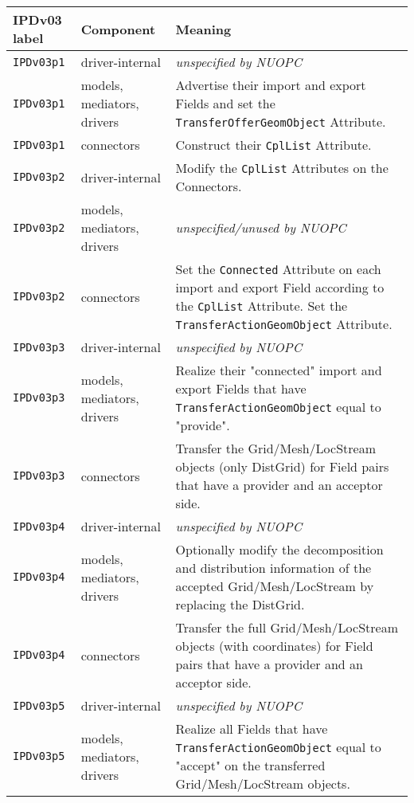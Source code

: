 \vspace*{3ex}
\begin{longtable}[h]{|p{35mm}|p{4cm}|p{6cm}|}
     \hline\hline
     {\bf IPDv03 label} & {\bf Component} & {\bf Meaning}\\
     \hline\hline
     {\tt IPDv03p1} & driver-internal             & {\em unspecified by NUOPC}\\ \hline
     {\tt IPDv03p1} & models, mediators, drivers  & Advertise their import and export Fields and set the {\tt TransferOfferGeomObject} Attribute.\\ \hline
     {\tt IPDv03p1} & connectors                  & Construct their {\tt CplList} Attribute.\\ \hline
     {\tt IPDv03p2} & driver-internal             & Modify the {\tt CplList} Attributes on the Connectors.\\ \hline
     {\tt IPDv03p2} & models, mediators, drivers  & {\em unspecified/unused by NUOPC}\\ \hline
     {\tt IPDv03p2} & connectors                  & Set the {\tt Connected} Attribute on each import and export Field according to the {\tt CplList} Attribute. Set the {\tt TransferActionGeomObject} Attribute.\\ \hline
     {\tt IPDv03p3} & driver-internal             & {\em unspecified by NUOPC}\\ \hline
     {\tt IPDv03p3} & models, mediators, drivers  & Realize their "connected" import and export Fields that have {\tt TransferActionGeomObject} equal to "provide".\\ \hline
     {\tt IPDv03p3} & connectors                  & Transfer the Grid/Mesh/LocStream objects (only DistGrid) for Field pairs that have a provider and an acceptor side.\\ \hline
     {\tt IPDv03p4} & driver-internal             & {\em unspecified by NUOPC}\\ \hline
     {\tt IPDv03p4} & models, mediators, drivers  & Optionally modify the decomposition and distribution information of the accepted Grid/Mesh/LocStream by replacing the DistGrid.\\ \hline
     {\tt IPDv03p4} & connectors                  & Transfer the full Grid/Mesh/LocStream objects (with coordinates) for Field pairs that have a provider and an acceptor side.\\ \hline
     {\tt IPDv03p5} & driver-internal             & {\em unspecified by NUOPC}\\ \hline
     {\tt IPDv03p5} & models, mediators, drivers  & Realize all Fields that have {\tt TransferActionGeomObject} equal to "accept" on the transferred Grid/Mesh/LocStream objects.\\ \hline

\end{longtable}
